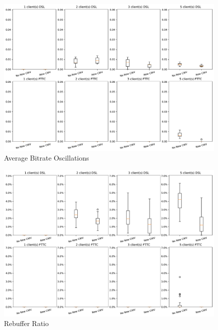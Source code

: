 \documentclass[10pt,sigconf,anonymous]{acmart}
\begin{document}

  

\begin{figure}
      \includegraphics[width=\textwidth]{figures/Average_Oscillations.pdf}

      \caption{Average Bitrate Oscillations}
      \label{fig:avg-oscillations}
\end{figure}
\begin{figure}
      \includegraphics[width=\textwidth, keepaspectratio]{figures/Rebuffer_Ratio.pdf}
    \caption{Rebuffer Ratio}
    \label{fig:rebuffer-ratio}
\end{figure}
\end{document}
